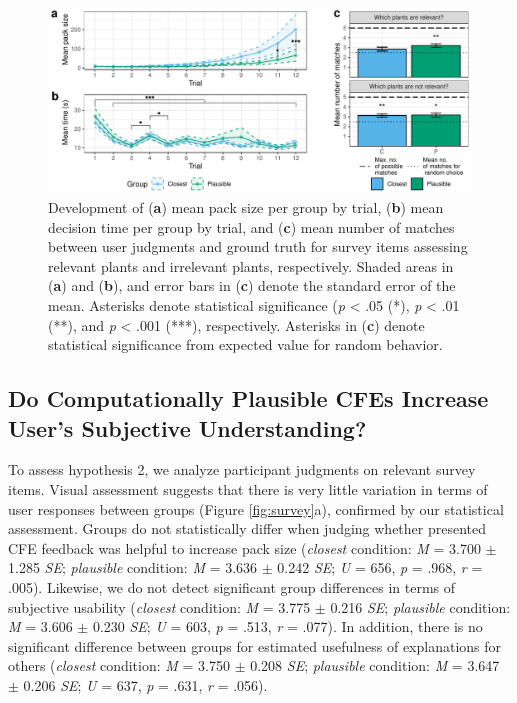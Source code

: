 \begin{figure}
   \centering
   \includegraphics[width=\textwidth]{./media/H1_p_ShubsPerTrial_RTPertrial_PAZ_FINAL.pdf}
   \caption{Development of (\textbf{a}) mean pack size per group by trial, (\textbf{b}) mean decision time per group by trial, and (\textbf{c}) mean number of matches between user judgments and ground truth for survey items assessing relevant plants and irrelevant plants, respectively. Shaded areas in (\textbf{a}) and (\textbf{b}), and error bars in (\textbf{c}) denote the standard error of the mean. Asterisks denote statistical significance (\textit{p} < .05 (*), \textit{p} < .01 (**), and \textit{p} < .001 (***), respectively. Asterisks in (\textbf{c}) denote statistical significance from expected value for random behavior.}
   \label{fig:hyp1}
 \end{figure}

\subsection{Do Computationally Plausible CFEs Increase User's Subjective Understanding?}
To assess hypothesis 2, we analyze participant judgments on relevant survey items.
Visual assessment suggests that there is very little variation in terms of user responses between groups (Figure \ref{fig:survey}a), confirmed by our statistical assessment. 
Groups do not statistically differ when judging whether presented \gls{CFE} feedback was helpful to increase pack size (\textit{closest} condition: \textit{M} = 3.700 $\pm$ 1.285 \textit{SE}; \textit{plausible} condition: \textit{M} = 3.636 $\pm$ 0.242 \textit{SE}; \textit{U} = 656, \textit{p} = .968, \textit{r} = .005).
Likewise, we do not detect significant group differences in terms of subjective usability (\textit{closest} condition: \textit{M} = 3.775 $\pm$ 0.216 \textit{SE}; \textit{plausible} condition: \textit{M} = 3.606 $\pm$ 0.230 \textit{SE}; \textit{U} = 603, \textit{p} = .513, \textit{r} = .077).
In addition, there is no significant difference between groups for estimated usefulness of explanations for others (\textit{closest} condition: \textit{M} = 3.750 $\pm$ 0.208 \textit{SE}; \textit{plausible} condition: \textit{M} = 3.647 $\pm$ 0.206 \textit{SE}; \textit{U} = 637, \textit{p} = .631, \textit{r} = .056).

